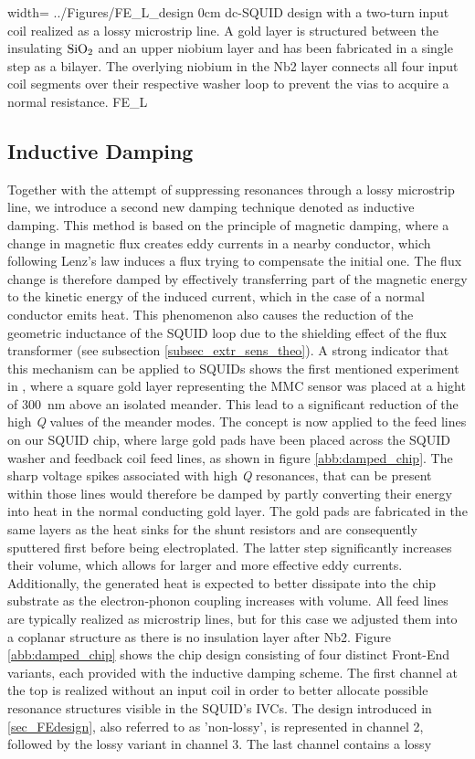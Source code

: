 {width=\textwidth}
{../Figures/FE_L_design}
{0cm}
{dc-SQUID design with a two-turn input coil realized as a lossy microstrip line. A gold layer is structured between the insulating $\rm SiO_2$ and an upper niobium layer and has been fabricated in a single step as a bilayer. The overlying niobium in the Nb2 layer connects all four input coil segments over their respective washer loop to prevent the vias to acquire a normal resistance.} 
{FE_L}

\subsection{Inductive Damping} \label{subsec_ind_damp}

Together with the attempt of suppressing resonances through a lossy microstrip line, we introduce a second new damping technique denoted as inductive damping. This method is based on the principle of magnetic damping, where a change in magnetic flux creates eddy currents in a nearby conductor, which following Lenz's law induces a flux trying to compensate the initial one. The flux change is therefore damped by effectively transferring part of the magnetic energy to the kinetic energy of the induced current, which in the case of a normal conductor emits heat. This phenomenon also causes the reduction of the geometric inductance of the SQUID loop due to the shielding effect of the flux transformer (see subsection \ref{subsec_extr_sens_theo}). A strong indicator that this mechanism can be applied to SQUIDs shows the first mentioned experiment in \cite{Boyd2022}, where a square gold layer representing the MMC sensor was placed at a hight of \qty{300}{\nano\meter} above an isolated meander. This lead to a significant reduction of the high \textit{Q} values of the meander modes. The concept is now applied to the feed lines on our SQUID chip, where large gold pads have been placed across the SQUID washer and feedback coil feed lines, as shown in figure \ref{abb:damped_chip}. The sharp voltage spikes associated with high \textit{Q} resonances, that can be present within those lines would therefore be damped by partly converting their energy into heat in the normal conducting gold layer. The gold pads are fabricated in the same layers as the heat sinks for the shunt resistors and are consequently sputtered first before being electroplated. The latter step significantly increases their volume, which allows for larger and more effective eddy currents. Additionally, the generated heat is expected to better dissipate into the chip substrate as the electron-phonon coupling increases with volume. All feed lines are typically realized as microstrip lines, but for this case we adjusted them into a coplanar structure as there is no insulation layer after Nb2. Figure \ref{abb:damped_chip} shows the chip design consisting of four distinct Front-End variants, each provided with the inductive damping scheme. The first channel at the top is realized without an input coil in order to better allocate possible resonance structures visible in the SQUID's IVCs. The design introduced in \ref{sec_FEdesign}, also referred to as 'non-lossy', is represented in channel 2, followed by the lossy variant in channel 3. The last channel contains a lossy 